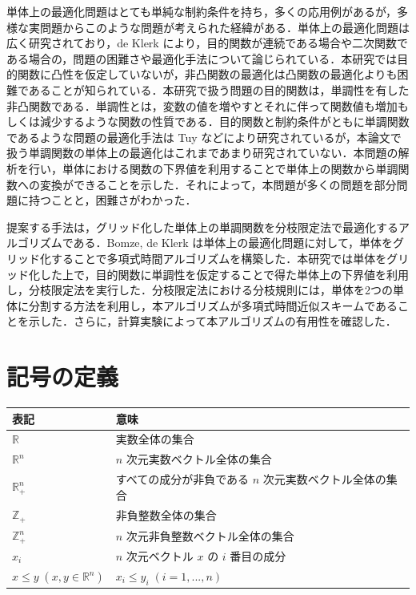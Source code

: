 \documentclass[a4paper,11pt]{jreport}
\begin{document}
単体上の最適化問題はとても単純な制約条件を持ち，多くの応用例があるが，多様な実問題からこのような問題が考えられた経緯がある．単体上の最適化問題は広く研究されており，de Klerk \cite{deklerk_survey} \cite{deklerk} により，目的関数が連続である場合や二次関数である場合の，問題の困難さや最適化手法について論じられている．本研究では目的関数に凸性を仮定していないが，非凸関数の最適化は凸関数の最適化よりも困難であることが知られている．本研究で扱う問題の目的関数は，単調性を有した非凸関数である．単調性とは，変数の値を増やすとそれに伴って関数値も増加もしくは減少するような関数の性質である．目的関数と制約条件がともに単調関数であるような問題の最適化手法は Tuy \cite{tuy} \cite{tuy_survey} などにより研究されているが，本論文で扱う単調関数の単体上の最適化はこれまであまり研究されていない．本問題の解析を行い，単体における関数の下界値を利用することで単体上の関数から単調関数への変換ができることを示した．それによって，本問題が多くの問題を部分問題に持つことと，困難さがわかった．\par
提案する手法は，グリッド化した単体上の単調関数を分枝限定法で最適化するアルゴリズムである．Bomze, de Klerk \cite{bomze} は単体上の最適化問題に対して，単体をグリッド化することで多項式時間アルゴリズムを構築した．本研究では単体をグリッド化した上で，目的関数に単調性を仮定することで得た単体上の下界値を利用し，分枝限定法を実行した．分枝限定法における分枝規則には，単体を2つの単体に分割する方法を利用し，本アルゴリズムが多項式時間近似スキームであることを示した．さらに，計算実験によって本アルゴリズムの有用性を確認した．

\section{記号の定義}

\begin{table}[htb]
\begin{tabular}{ll}
表記 & 意味 \\ \hline
$ \mathbb{R} $ & 実数全体の集合 \\
$ \mathbb{R}^n $ & $ n $ 次元実数ベクトル全体の集合 \\
$ \mathbb{R}_+^n $ & すべての成分が非負である $ n $ 次元実数ベクトル全体の集合 \\
$ \mathbb{Z}_+ $ & 非負整数全体の集合 \\
$ \mathbb{Z}_+^n $ & $ n $ 次元非負整数ベクトル全体の集合 \\
$ x_i $ & $ n $ 次元ベクトル $ x $ の $ i $ 番目の成分 \\
$ x \leq y \; (x, y \in \mathbb{R}^n) $ & $ x_i \leq y_i \; (i = 1, ..., n) $
\end{tabular}
\end{table}
\end{document}

